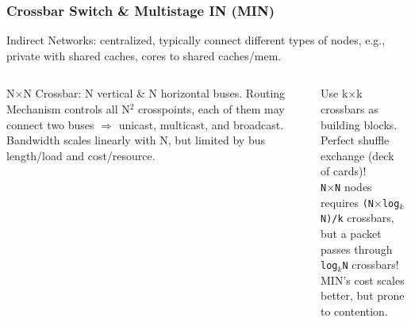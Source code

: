 \documentclass{beamer}
\renewcommand{\emph}[1]{\textcolor{structure}{#1}}
\newcommand{\emp}[1]{\textcolor{DikuRed}{ #1}}
\begin{document}
\begin{frame}[fragile,t]
\frametitle{Crossbar Switch \& Multistage IN (MIN)}

Indirect Networks: centralized, typically connect different types of nodes, 
e.g., private with shared caches, cores to shared caches/mem.

\vspace{-1ex}
\pause
\vspace{-15ex}

\begin{scriptsize}
\begin{columns}
\emp{N$\times$N Crossbar:} N vertical \& N horizontal buses. Routing Mechanism
controls all \emp{N$^2$ crosspoints}, each of them may connect two buses $\Rightarrow$
unicast, multicast, and broadcast.\\
\emph{Bandwidth scales linearly with N}, but 
\alert{limited by bus length/load and cost/resource.}

Use k$\times$k crossbars as building blocks.\\
\emp{Perfect shuffle exchange} (deck of cards)!\\
{\tt N$\times$N} nodes requires \emph{\tt (N$\times$log$_k$N)/k} crossbars,\\
but a packet passes through \emp{\tt log$_k$N} crossbars!\\
MIN's \emph{cost scales better}, but \alert{prone to contention}.
\end{columns}
\end{scriptsize}
\end{frame}
\end{document}
